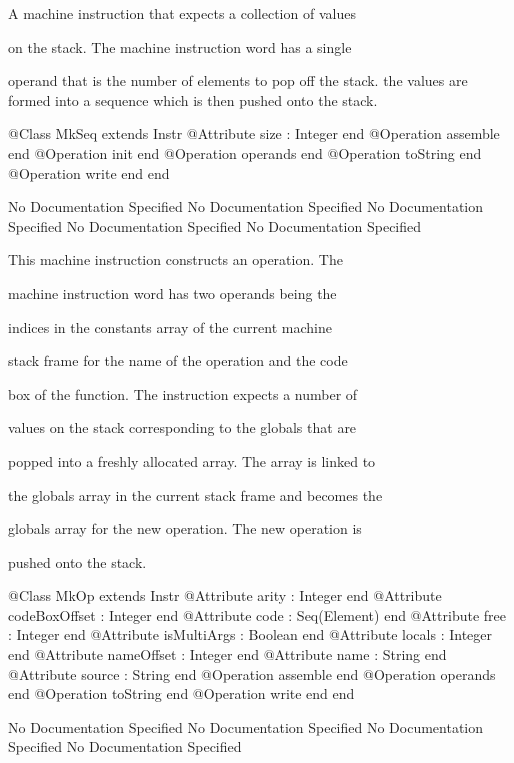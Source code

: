       A machine instruction that expects a collection of values

      on the stack. The machine instruction word has a single

      operand that is the number of elements to pop off the stack.
      the values are formed into a sequence which is then pushed onto 
      the stack.
\begin{Interface}
@Class MkSeq extends Instr
  @Attribute size : Integer end
  @Operation assemble end
  @Operation init end
  @Operation operands end
  @Operation toString end
  @Operation write end
end
\end{Interface}
No Documentation Specified
No Documentation Specified
No Documentation Specified
No Documentation Specified
No Documentation Specified

      This machine instruction constructs an operation. The

      machine instruction word has two operands being the

      indices in the constants array of the current machine

      stack frame for the name of the operation and the code

      box of the function. The instruction expects a number of

      values on the stack corresponding to the globals that are

      popped into a freshly allocated array. The array is linked to

      the globals array in the current stack frame and becomes the

      globals array for the new operation. The new operation is

      pushed onto the stack.
\begin{Interface}
@Class MkOp extends Instr
  @Attribute arity : Integer end
  @Attribute codeBoxOffset : Integer end
  @Attribute code : Seq(Element) end
  @Attribute free : Integer end
  @Attribute isMultiArgs : Boolean end
  @Attribute locals : Integer end
  @Attribute nameOffset : Integer end
  @Attribute name : String end
  @Attribute source : String end
  @Operation assemble end
  @Operation operands end
  @Operation toString end
  @Operation write end
end
\end{Interface}
No Documentation Specified
No Documentation Specified
No Documentation Specified
No Documentation Specified

